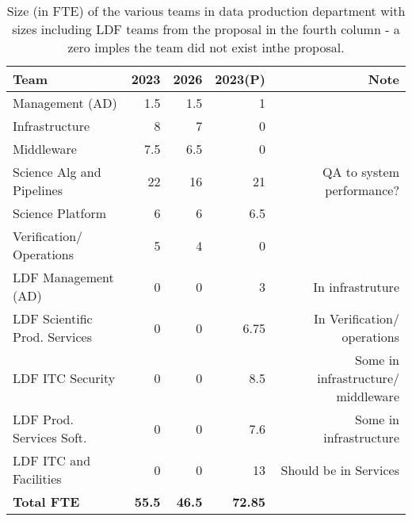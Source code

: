 \begin{longtable} { |p{}  |r  |r  |r  |r |} 
\caption{Size (in \gls{FTE}) of the various teams in data production department with sizes including \gls{LDF} teams from the proposal in the fourth column - a zero imples the team did not exist inthe proposal. \label{tab:FTE}}\\ 
\hline 
\textbf{Team}&\textbf{2023}&\textbf{2026}&\textbf{2023(P)}&\textbf{Note} \\ \hline
{Management (\gls{AD})}&{1.5}&{1.5}&{1}& \\ \hline
{Infrastructure}&{8}&{7}&{0}&{ } \\ \hline
{Middleware}&{7.5}&{6.5}&{0}& \\ \hline
{Science Alg and Pipelines}&{22}&{16}&{21}&{QA  to system performance?} \\ \hline
{Science Platform}&{6}&{6}&{6.5}& \\ \hline
{Verification/ Operations}&{5}&{4}&{0}& \\ \hline
{LDF Management (\gls{AD}) }&{0}&{0}&{3}&{In infrastruture} \\ \hline
{LDF Scientific Prod. Services}&{0}&{0}&{6.75}&{In Verification/ operations} \\ \hline
{LDF \gls{ITC} Security}&{0}&{0}&{8.5}&{Some in infrastructure/ middleware } \\ \hline
{LDF Prod. Services Soft.}&{0}&{0}&{7.6}&{Some in infrastructure} \\ \hline
{LDF \gls{ITC} and Facilities}&{0}&{0}&{13}&{Should be in Services} \\ \hline
\textbf{Total  FTE}&\textbf{55.5}&\textbf{46.5}&\textbf{72.85}& \\ \hline
\end{longtable}

